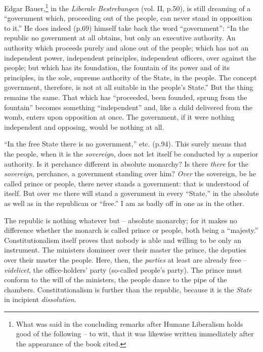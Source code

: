\documentclass[12pt,a4paper]{book}
\begin{document}
Edgar Bauer,\footnote{What was said in the concluding remarks after Humane 
Liberalism holds good of the following -- to wit, that it was likewise written 
immediately after the appearance of the book cited.} in the \textit{Liberale 
Bestrebungen} (vol. II, p.50), is still dreaming of a ``government which, 
proceeding out of the people, can never stand in opposition to it.'' He does 
indeed (p.69) himself take back the word ``government'': ``In the republic 
no government at all obtains, but only an executive authority. An authority 
which proceeds purely and alone out of the people; which has not an 
independent power, independent principles, independent officers, over against 
the people; but which has its foundation, the fountain of its power and of its 
principles, in the sole, supreme authority of the State, in the people. The 
concept government, therefore, is not at all suitable in the people's 
State.'' But the thing remains the same. That which has ``proceeded, been 
founded, sprung from the fountain'' becomes something ``independent'' and, 
like a child delivered from the womb, enters upon opposition at once. The 
government, if it were nothing independent and opposing, would be nothing at 
all.

``In the free State there is no government,'' etc. (p.94). This surely means 
that the people, when it is the \textit{sovereign}, does not let itself be 
conducted by a superior authority. Is it perchance different in absolute 
monarchy? Is there \textit{there} for the \textit{sovereign}, perchance, a 
government standing over him? \textit{Over} the sovereign, be he called prince 
or people, there never stands a government: that is understood of itself. But 
over \textit{me} there will stand a government in every ``State,'' in the 
absolute as well as in the republican or ``free.'' I am as badly off in one 
as in the other.

The republic is nothing whatever but -- absolute monarchy; for it makes no 
difference whether the monarch is called prince or people, both being a 
``majesty.'' Constitutionalism itself proves that nobody is able and willing 
to be only an instrument. The ministers domineer over their master the prince, 
the deputies over their master the people. Here, then, the \textit{parties} at 
least are already free -- \textit{videlicet}, the office-holders' party 
(so-called people's party). The prince must conform to the will of the 
ministers, the people dance to the pipe of the chambers. Constitutionalism is 
further than the republic, because it is the \textit{State} in incipient 
\textit{dissolution}.
\end{document}
